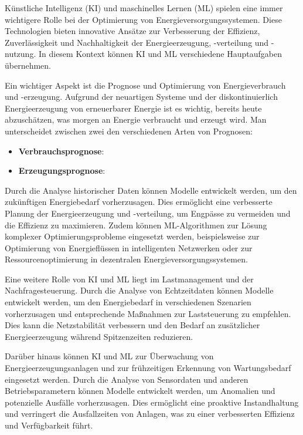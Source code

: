Künstliche Intelligenz (KI) und maschinelles Lernen (ML) spielen eine immer
wichtigere Rolle bei der Optimierung von Energieversorgungssystemen. Diese
Technologien bieten innovative Ansätze zur Verbesserung der Effizienz,
Zuverlässigkeit und Nachhaltigkeit der Energieerzeugung, -verteilung und
-nutzung. In diesem Kontext können KI und ML verschiedene Hauptaufgaben
übernehmen.

Ein wichtiger Aspekt ist die Prognose und Optimierung von Energieverbrauch und
-erzeugung. Aufgrund der neuartigen Systeme und der diskontinuierlich
Energieerzeugung von erneuerbarer Energie ist es wichtig, bereits heute 
abzuschätzen, was morgen an Energie verbraucht und erzeugt wird. 
Man unterscheidet zwischen zwei den verschiedenen Arten von Prognosen:

\begin{itemize}
    \item \textbf{Verbrauchsprognose}:
          
    \item \textbf{Erzeugungsprognose}:
          
\end{itemize}

Durch die Analyse
historischer Daten können Modelle entwickelt werden, um den zukünftigen
Energiebedarf vorherzusagen. Dies ermöglicht eine verbesserte Planung der
Energieerzeugung und -verteilung, um Engpässe zu vermeiden und die Effizienz zu
maximieren. Zudem können ML-Algorithmen zur Lösung komplexer
Optimierungsprobleme eingesetzt werden, beispielsweise zur Optimierung von
Energieflüssen in intelligenten Netzwerken oder zur Ressourcenoptimierung in
dezentralen Energieversorgungssystemen.

Eine weitere Rolle von KI und ML liegt im Lastmanagement und der
Nachfragesteuerung. Durch die Analyse von Echtzeitdaten können Modelle
entwickelt werden, um den Energiebedarf in verschiedenen Szenarien
vorherzusagen und entsprechende Maßnahmen zur Laststeuerung zu empfehlen. Dies
kann die Netzstabilität verbessern und den Bedarf an zusätzlicher
Energieerzeugung während Spitzenzeiten reduzieren.

Darüber hinaus können KI und ML zur Überwachung von Energieerzeugungsanlagen
und zur frühzeitigen Erkennung von Wartungsbedarf eingesetzt werden. Durch die
Analyse von Sensordaten und anderen Betriebsparametern können Modelle
entwickelt werden, um Anomalien und potenzielle Ausfälle vorherzusagen. Dies
ermöglicht eine proaktive Instandhaltung und verringert die Ausfallzeiten von
Anlagen, was zu einer verbesserten Effizienz und Verfügbarkeit führt.

